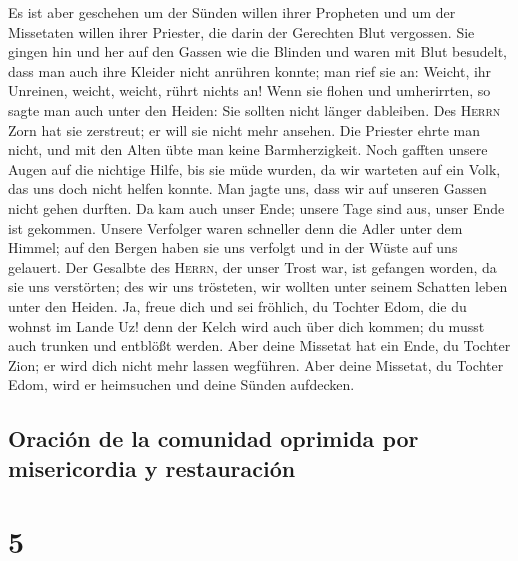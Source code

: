  Es ist aber geschehen um der Sünden willen ihrer
Propheten und um der Missetaten willen ihrer Priester, die darin der
Gerechten Blut vergossen.  Sie gingen hin und her auf den
Gassen wie die Blinden und waren mit Blut besudelt, dass man auch ihre
Kleider nicht anrühren konnte;  man rief sie an: Weicht,
ihr Unreinen, weicht, weicht, rührt nichts an! Wenn sie flohen und
umherirrten, so sagte man auch unter den Heiden: Sie sollten nicht
länger dableiben.  Des \textsc{Herrn} Zorn hat sie
zerstreut; er will sie nicht mehr ansehen. Die Priester ehrte man nicht,
und mit den Alten übte man keine Barmherzigkeit.  Noch
gafften unsere Augen auf die nichtige Hilfe, bis sie müde wurden, da wir
warteten auf ein Volk, das uns doch nicht helfen konnte. 
Man jagte uns, dass wir auf unseren Gassen nicht gehen durften. Da kam
auch unser Ende; unsere Tage sind aus, unser Ende ist gekommen.
 Unsere Verfolger waren schneller denn die Adler unter
dem Himmel; auf den Bergen haben sie uns verfolgt und in der Wüste auf
uns gelauert.  Der Gesalbte des \textsc{Herrn}, der unser
Trost war, ist gefangen worden, da sie uns verstörten; des wir uns
trösteten, wir wollten unter seinem Schatten leben unter den Heiden.
 Ja, freue dich und sei fröhlich, du Tochter Edom, die du
wohnst im Lande Uz! denn der Kelch wird auch über dich kommen; du musst
auch trunken und entblößt werden.  Aber deine Missetat
hat ein Ende, du Tochter Zion; er wird dich nicht mehr lassen wegführen.
Aber deine Missetat, du Tochter Edom, wird er heimsuchen und deine
Sünden aufdecken.

\hypertarget{oraciuxf3n-de-la-comunidad-oprimida-por-misericordia-y-restauraciuxf3n}{%
\subsection{Oración de la comunidad oprimida por misericordia y
restauración}\label{oraciuxf3n-de-la-comunidad-oprimida-por-misericordia-y-restauraciuxf3n}}

\hypertarget{section-4}{%
\section{5}\label{section-4}}

